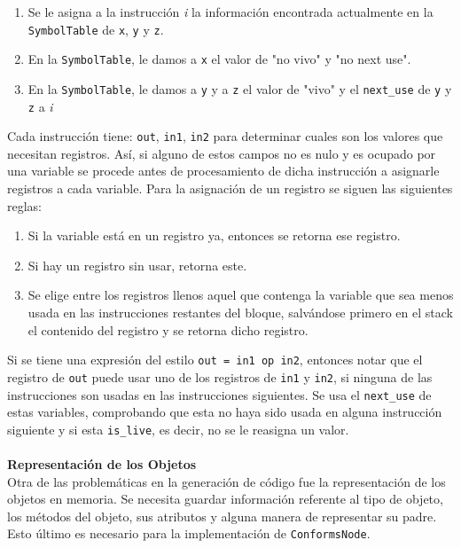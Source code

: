 \documentclass[11pt]{scrartcl} %
\begin{document}
\begin{enumerate}
	\item Se le asigna a la instrucción \textit{i} la información encontrada actualmente en la \texttt{SymbolTable} de \texttt{x}, \texttt{y} y \texttt{z}.
	\item En la \texttt{SymbolTable}, le damos a \texttt{x} el valor de "no vivo" y "no next use".
	\item En la \texttt{SymbolTable}, le damos a \texttt{y} y a \texttt{z} el valor de "vivo" y el \texttt{next\_use} de \texttt{y} y \texttt{z} a \textit{i}
\end{enumerate}

Cada instrucción tiene: \texttt{out}, \texttt{in1}, \texttt{in2} para determinar cuales son los valores que necesitan registros. Así, si alguno de estos campos no es nulo y es ocupado por una variable se procede antes de procesamiento de dicha instrucción a asignarle registros a cada variable. Para la asignación de un registro se siguen las siguientes reglas:

\begin{enumerate}
	\item Si la variable está en un registro ya, entonces se retorna ese registro.
	\item Si hay un registro sin usar, retorna este.
	\item Se elige entre los registros llenos aquel que contenga la variable que sea menos usada en las instrucciones restantes del bloque, salvándose primero en el stack el contenido del registro y se retorna dicho registro.
\end{enumerate}

Si se tiene una expresión del estilo \texttt{out = in1 op in2}, entonces notar que el registro de \texttt{out} puede usar uno de los registros de \texttt{in1} y \texttt{in2}, si ninguna de las instrucciones son usadas en las instrucciones siguientes. Se usa el \texttt{next\_use} de estas variables, comprobando que esta no haya sido usada en alguna instrucción siguiente y si esta \texttt{is\_live}, es decir, no se le reasigna un valor.\\\\

\textbf{Representación de los Objetos}\\

Otra de las problemáticas en la generación de código fue la representación de los objetos en memoria. Se necesita guardar información referente al tipo de objeto, los métodos del objeto, sus atributos y alguna manera de representar su padre. Esto último es necesario para la implementación de \texttt{ConformsNode}.
\end{document}
